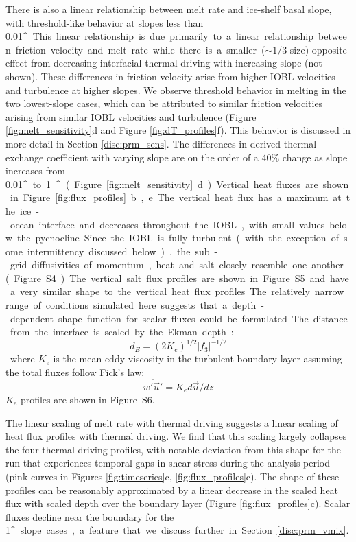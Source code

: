 \documentclass[tc, manuscript]{copernicus}
\begin{document}
There is also a linear relationship between melt rate and ice-shelf basal slope, with threshold-like behavior at slopes less than 0.01\unit{^{\circ}}. This linear relationship is due primarily to a linear relationship between friction velocity and melt rate while there is a smaller ($\sim\!1/3$ size) opposite effect from decreasing interfacial thermal driving with increasing slope (not shown). These differences in friction velocity arise from higher IOBL velocities and turbulence at higher slopes. We observe threshold behavior in melting in the two lowest-slope cases, which can be attributed to similar friction velocities arising from similar IOBL velocities and turbulence (Figure \ref{fig:melt_sensitivity}d and Figure \ref{fig:dT_profiles}f). This behavior is discussed in more detail in Section \ref{disc:prm_sens}. The differences in derived thermal exchange coefficient with varying slope are on the order of a 40\% change as slope increases from 0.01\unit{^{\circ}} to 1\unit{^{\circ}} (Figure \ref{fig:melt_sensitivity}d).  

Vertical heat fluxes are shown in Figure \ref{fig:flux_profiles}b,e. The vertical heat flux has a maximum at the ice-ocean interface and decreases throughout the IOBL, with small values below the pycnocline. Since the IOBL is fully turbulent (with the exception of some intermittency discussed below), the sub-grid diffusivities of momentum, heat and salt closely resemble one another (Figure~S4). The vertical salt flux profiles are shown in Figure~S5 and have a very similar shape to the vertical heat flux profiles.

The relatively narrow range of conditions simulated here suggests that a depth-dependent shape function for scalar fluxes could be formulated. The distance from the interface is scaled by the Ekman depth:
\begin{equation}
    d_E = (2 K_e)^{1/2} |f_3|^{-1/2}
\end{equation}
where $K_e$ is the mean eddy viscosity in the turbulent boundary layer assuming the total fluxes follow Fick's law:
\begin{equation}
    \overline{w'\vec{u}'} = K_e d\vec{u}/dz
\end{equation}
$K_e$ profiles are shown in Figure~S6. 

The linear scaling of melt rate with thermal driving suggests a linear scaling of heat flux profiles with thermal driving. We find that this scaling largely collapses the four thermal driving profiles, with notable deviation from this shape for the run that experiences temporal gaps in shear stress during the analysis period (pink curves in Figures \ref{fig:timeseries}c, \ref{fig:flux_profiles}c). The shape of these profiles can be reasonably approximated by a linear decrease in the scaled heat flux with scaled depth over the boundary layer (Figure \ref{fig:flux_profiles}c). Scalar fluxes decline near the boundary for the 1\unit{^{\circ}} slope cases, a feature that we discuss further in Section \ref{disc:prm_vmix}. 
\end{document}
